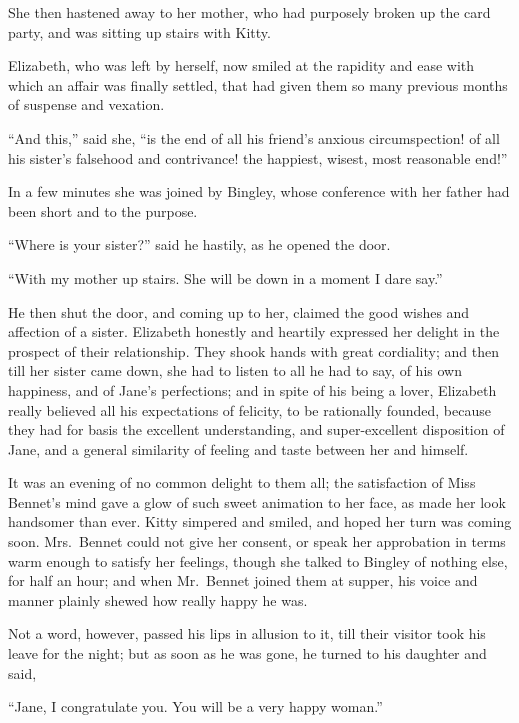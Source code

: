 She then hastened away to her mother, who had purposely
broken up the card party, and was sitting up stairs
with Kitty.

Elizabeth, who was left by herself, now smiled at the
rapidity and ease with which an affair was finally settled,
that had given them so many previous months of suspense
and vexation.

“And this,” said she, “is the end of all his friend’s
anxious circumspection! of all his sister’s falsehood
and contrivance! the happiest, wisest, most reasonable
end!”

In a few minutes she was joined by Bingley, whose
conference with her father had been short and to the
purpose.

“Where is your sister?” said he hastily, as he opened
the door.

“With my mother up stairs. She will be down in a
moment I dare say.”

He then shut the door, and coming up to her, claimed
the good wishes and affection of a sister. Elizabeth
honestly and heartily expressed her delight in the prospect
of their relationship. They shook hands with great
cordiality; and then till her sister came down, she had
to listen to all he had to say, of his own happiness, and
of Jane’s perfections; and in spite of his being a lover,
Elizabeth really believed all his expectations of felicity,
to be rationally founded, because they had for basis the
excellent understanding, and super-excellent disposition
of Jane, and a general similarity of feeling and taste
between her and himself.

It was an evening of no common delight to them all;
the satisfaction of Miss Bennet’s mind gave a glow of
such sweet animation to her face, as made her look handsomer
than ever. Kitty simpered and smiled, and hoped
her turn was coming soon. Mrs.\ Bennet could not give
her consent, or speak her approbation in terms warm
enough to satisfy her feelings, though she talked to Bingley
of nothing else, for half an hour; and when Mr.\ Bennet
joined them at supper, his voice and manner plainly
shewed how really happy he was.

Not a word, however, passed his lips in allusion to it,
till their visitor took his leave for the night; but as soon
as he was gone, he turned to his daughter and said,

\begin{sloppypar}
“Jane, I congratulate you. You will be a very happy
woman.”
\end{sloppypar}


